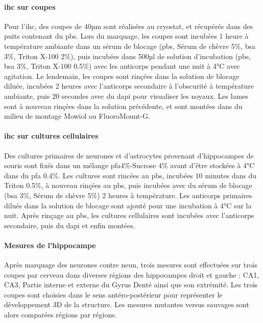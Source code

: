 \paragraph{\Acrlong{ihc} sur coupes}	
\label{par:ihccoupe}
	Pour l'\Gls{ihc}, des coupes de 40µm sont réalisées au cryostat, et récupérés dans des puits contenant du \acrshort{pbs}. Lors du marquage, les coupes sont incubées 1 heure à température ambiante dans un sérum de blocage (\acrshort{pbs}, Sérum de chèvre 5\%, \acrshort{bsa} 3\%, Triton X-100 2\%), puis  incubées dans 500µl de solution d'incubation (\acrshort{pbs}, \acrshort{bsa} 3\%, Triton X-100 0.5\%) avec les anticorps pendant une nuit à 4°C avec agitation. Le lendemain, les coupes sont rinçées dans la solution de blocage diluée, incubées 2 heures avec l'anticorps secondaire à l'obscurité à température ambiante, puis 20 secondes avec du \gls{dapi} pour visualiser les noyaux. Les lames sont à nouveau rinçées dans la solution précédente, et sont montées dans du milieu de montage Mowiol ou FluoroMount-G\textregistered.
	
\paragraph{\Acrlong{ihc} sur cultures cellulaires}
\label{par:ihcculture}
	Des cultures primaires de neurones et d'astrocytes provenant d'hippocampes de souris sont fixés dans un mélange \gls{pfa}4\%-Sucrose 4\% avant d'être stockées à 4°C dans du \gls{pfa} 0.4\%. Les cultures sont rincées au \acrshort{pbs}, incubées 10 minutes dans du Triton 0.5\%, à nouveau rinçées au \acrshort{pbs}, puis incubées avec du sérum de blocage (\acrshort{bsa} 3\%, Sérum de chèvre 5\%) 2 heures à température. Les anticorps primaires dilués dans la solution de blocage sont ajouté pour une incubation à 4°C sur la nuit.  Après rinçage au \acrshort{pbs}, les cultures cellulaires sont incubées avec l'anticorps secondaire, puis du \acrshort{dapi} et enfin montées.
	
\paragraph{Mesures de l'hippocampe}
\label{par:hippNeuN}
	Après marquage des neurones contre \acrshort{neun}, trois mesures sont effectuées sur trois coupes par cerveau dans diverses régions des hippocampes droit et gauche : CA1, CA3, Partie interne et externe du Gyrus Denté ainsi que son extrémité. Les trois coupes sont choisies dans le sens antéro-postérieur pour représenter le développement 3D de la structure. Les mesures mutantes versus sauvages sont alors comparées régions par régions.
	

